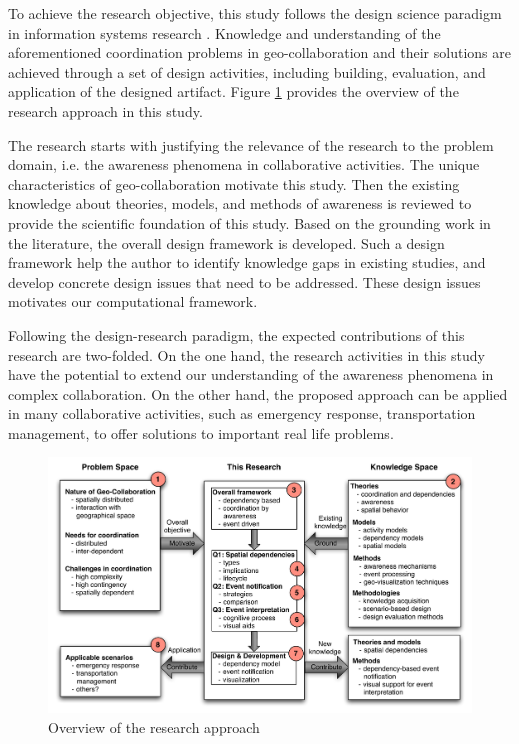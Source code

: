 To achieve the research objective, this study follows the design science paradigm in information systems research \cite{Hevner2004}. Knowledge and understanding of the aforementioned coordination problems in geo-collaboration and their solutions are achieved through a set of design activities, including building, evaluation, and application of the designed artifact. Figure \ref{fig:research_overview} provides the overview of the research approach in this study.

The research starts with justifying the relevance of the research to the problem domain, i.e. the awareness phenomena in collaborative activities. The unique characteristics of geo-collaboration motivate this study. Then the existing knowledge about theories, models, and methods of awareness is reviewed to provide the scientific foundation of this study. Based on the grounding work in the literature, the overall design framework is developed. Such a design framework help the author to identify knowledge gaps in existing studies, and develop concrete design issues that need to be addressed. These design issues motivates our computational framework.

Following the design-research paradigm, the expected contributions of this research are two-folded. On the one hand, the research activities in this study have the potential to extend our understanding of the awareness phenomena in complex collaboration. On the other hand, the proposed approach can be applied in many collaborative activities, such as emergency response, transportation management, to offer solutions to important real life problems.


\begin{figure}[htbp] %
   \centering
   \includegraphics[width=5.8in]{research_overview.pdf} 
   \caption{Overview of the research approach}
   \label{fig:research_overview}
\end{figure}

